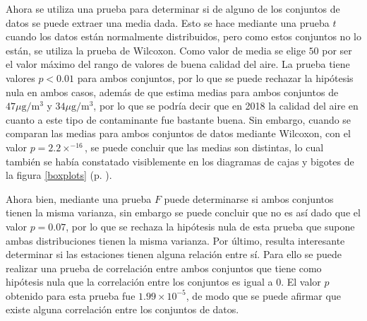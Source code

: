 \documentclass[paper=leter, fontsize=11pt]{scrartcl}
\numberwithin{equation}{section}		%
\numberwithin{figure}{section}			%
\numberwithin{table}{section}				%
\begin{document}
Ahora se utiliza una prueba para determinar si de alguno de los conjuntos de datos se puede extraer una media dada. Esto se hace mediante una prueba $t$ cuando los datos están normalmente distribuidos, pero como estos conjuntos no lo están, se utiliza la prueba de Wilcoxon. Como valor de media se elige $50$ por ser el valor máximo del rango de valores de buena calidad del aire. La prueba tiene valores $p < 0.01$ para ambos conjuntos, por lo que se puede rechazar la hipótesis nula en ambos casos, además de que estima medias para ambos conjuntos de $47\mu\text{g}/\text{m}^3$ y $34\mu\text{g}/\text{m}^3$, por lo que se podría decir que en 2018 la calidad del aire en cuanto a este tipo de contaminante fue bastante buena. Sin embargo, cuando se comparan las medias para ambos conjuntos de datos mediante Wilcoxon, con el valor $p = 2.2 \times ^{-16}$, se puede concluir que las medias son distintas, lo cual también se había constatado visiblemente en los diagramas de cajas y bigotes de la figura \ref{boxplots} (p. \pageref{boxplots}).

Ahora bien, mediante una prueba $F$ puede determinarse si ambos conjuntos tienen la misma varianza, sin embargo se puede concluir que no es así dado que el valor $p = 0.07$, por lo que se rechaza la hipótesis nula de esta prueba que supone ambas distribuciones tienen la misma varianza. Por último, resulta interesante determinar si las estaciones tienen alguna relación entre sí. Para ello se puede realizar una prueba de correlación entre ambos conjuntos que tiene como hipótesis nula que la correlación entre los conjuntos es igual a $0$. El valor $p$ obtenido para esta prueba fue $1.99 \times 10 ^{-5}$, de modo que se puede afirmar que existe alguna correlación entre los conjuntos de datos.



\end{document}
